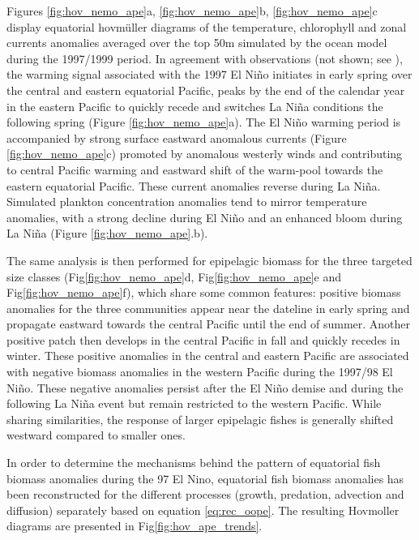 Figures \ref{fig:hov_nemo_ape}a, \ref{fig:hov_nemo_ape}b, \ref{fig:hov_nemo_ape}c display equatorial hovmüller diagrams of the temperature, chlorophyll and zonal currents anomalies averaged over the top 50m simulated by the ocean model during the 1997/1999 period. In agreement with observations (not shown; see \cite{lengaigneOceanResponseMarch2002}), the warming signal associated with the 1997 El Niño initiates in early spring over the central and eastern equatorial Pacific, peaks by the end of the calendar year in the eastern Pacific to quickly recede and switches La Niña conditions the following spring (Figure \ref{fig:hov_nemo_ape}a). The El Niño warming period is accompanied by strong surface eastward anomalous currents (Figure \ref{fig:hov_nemo_ape}c) promoted by anomalous westerly winds and contributing to central Pacific warming and eastward shift of the warm-pool towards the eastern equatorial Pacific. These current anomalies reverse during La Niña. Simulated plankton concentration anomalies tend to mirror temperature anomalies, with a strong decline during El Niño and an enhanced bloom during La Niña (Figure \ref{fig:hov_nemo_ape}.b). 

The same analysis is then performed for epipelagic biomass for the three targeted size classes (Fig\ref{fig:hov_nemo_ape}d, Fig\ref{fig:hov_nemo_ape}e and Fig\ref{fig:hov_nemo_ape}f), which share some common features: positive biomass anomalies for the three communities appear near the dateline in early spring and propagate eastward towards the central Pacific until the end of summer. Another positive patch then develops in the central Pacific in fall and quickly recedes in winter. These positive anomalies in the central and eastern Pacific  are associated with negative biomass anomalies in the western Pacific during the 1997/98 El Niño. These negative anomalies persist after the El Niño demise and during the following La Niña event but remain restricted to the western Pacific. While sharing similarities, the response of larger epipelagic fishes is generally shifted westward compared to smaller ones.

In order to determine the mechanisms behind the pattern of equatorial fish biomass anomalies during the 97 El Nino, equatorial fish biomass anomalies has been reconstructed for the different processes (growth, predation, advection and diffusion) separately based on equation \ref{eq:rec_oope}. The resulting Hovmoller diagrams are presented in Fig\ref{fig:hov_ape_trends}.

